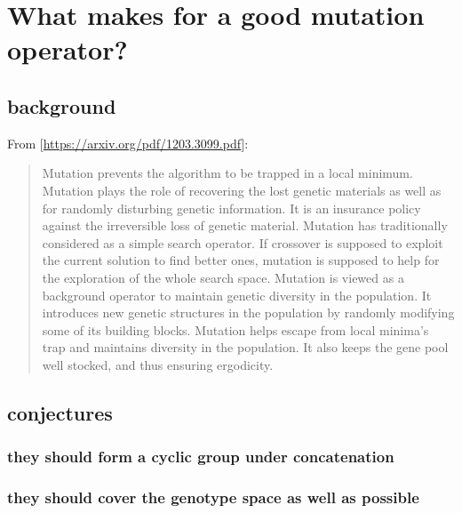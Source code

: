\documentclass[11pt]{article}
\date{\today}
\title{}
\begin{document}
\tableofcontents

\section{What makes for a good mutation operator?}
\label{sec:org2fe87d5}

\subsection{background}
\label{sec:org7af4ac7}

From [\url{https://arxiv.org/pdf/1203.3099.pdf}]:

\begin{quote}
Mutation prevents the algorithm to be trapped in a local minimum. Mutation plays
the role of recovering the lost genetic materials as well as for randomly
disturbing genetic information. It is an insurance policy against the
irreversible loss of genetic material. Mutation has traditionally considered as
a simple search operator. If crossover is supposed to exploit the current
solution to find better ones, mutation is supposed to help for the exploration
of the whole search space. Mutation is viewed as a background operator to
maintain genetic diversity in the population. It introduces new genetic
structures in the population by randomly modifying some of its building blocks.
Mutation helps escape from local minima’s trap and maintains diversity in the
population. It also keeps the gene pool well stocked, and thus ensuring
ergodicity. 
\end{quote}


\subsection{conjectures}
\label{sec:org37bcbfa}

\subsubsection{they should form a cyclic group under concatenation}
\label{sec:org2f8e158}
\subsubsection{they should cover the genotype space as well as possible}
\label{sec:org11a4995}
\end{document}

